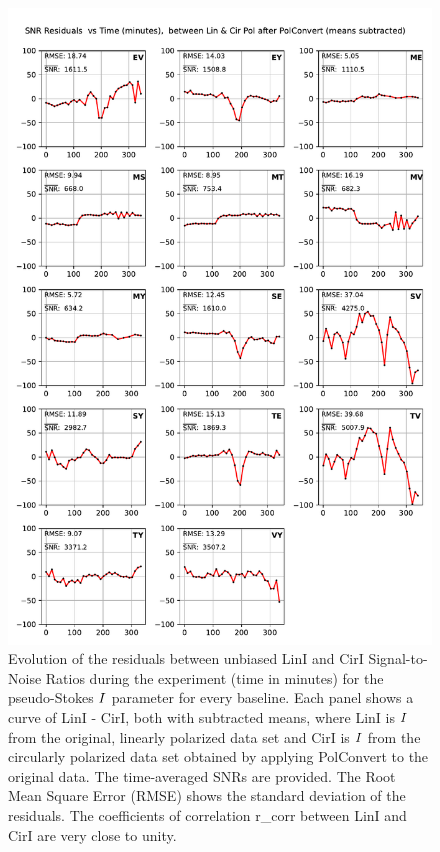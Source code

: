 \documentclass[letterpaper,twoside,12pt]{article}
\begin{document}
\begin{figure}[ht!]
  \begin{center}
  \includegraphics[width=33pc]{SNR_Lin_I_minus_Cir_I.pdf}
  \caption{\small  Evolution of the residuals between unbiased LinI and CirI Signal-to-Noise Ratios during the experiment (time in minutes) for the pseudo-Stokes $\protect I$ parameter for every baseline. Each panel shows a curve of LinI - CirI, both with subtracted means, where LinI is $\protect I$ from the original, linearly polarized data set and CirI is $\protect I$ from the circularly polarized data set obtained by applying PolConvert to the original data. The time-averaged SNRs are provided. The Root Mean Square Error (RMSE) shows the standard deviation of the residuals. The coefficients of correlation r\_corr between LinI and CirI are very close to unity.}
  \label{snr_lin_minus_cir}
  \end{center}
\end{figure}
\end{document}

